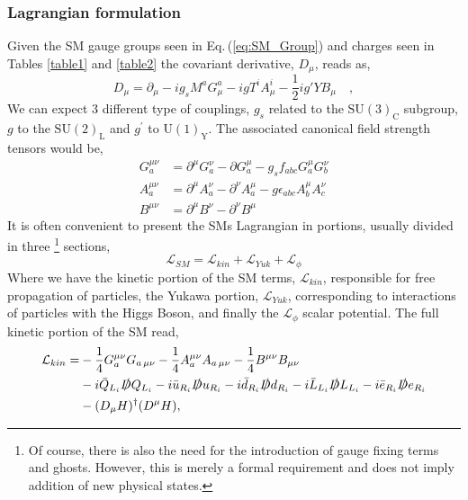 \subsubsection{Lagrangian formulation }
%
Given the SM gauge groups seen in  Eq.\,(\ref{eq:SM_Group}) and charges seen in Tables \ref{table1} and \ref{table2} the covariant derivative, $D_\mu$, reads as, 
%
\begin{equation}
\label{eq:PartialDefSM}
D_\mu = \partial_\mu - i g_s M^a G^a_\mu - i g T^i A^i_\mu - \frac{1}{2} i g' Y B_\mu \quad ,  
\end{equation}  
%
We can expect 3 different type of couplings, $g_s$ related to the $\mathrm{SU(3)_C}$ subgroup, $g$ to the $\mathrm{SU(2)_L}$ and $g^\prime$ to $\mathrm{U(1)_Y}$. The associated canonical field strength tensors would be,
\begin{align}
G_a^{\mu \nu} & = \partial^\mu G^\nu_a - \partial G^\mu_a - g_s f_{abc} G_a^\mu G_b^\nu  \\ 
A_a^{\mu \nu} & = \partial^\mu A^\nu_a - \partial^\nu A^\mu_a  - g \epsilon_{abc} A^\mu_b A^\nu_c \\
B^{\mu \nu}   & = \partial^\mu B^\nu - \partial^\nu B^\mu 
\end{align}
It is often convenient to present the SMs Lagrangian in portions, usually divided in three \footnote{Of course, there is also the need for the introduction of gauge fixing terms and ghosts. However, this is merely a formal requirement and does not imply addition of new physical states.} sections,
\begin{equation}
\mathcal{L}_{SM} = \mathcal{L}_{kin}  +  \mathcal{L}_{Yuk} +  \mathcal{L}_{\phi} 	
\end{equation}
Where we have the kinetic portion of the SM terms, $\mathcal{L}_{kin}$, responsible for  free propagation of particles, the Yukawa portion, $\mathcal{L}_{Yuk}$,  corresponding to interactions of particles with the Higgs Boson, and finally the $\mathcal{L}_{\phi}$ scalar potential. The full kinetic portion of the SM read, 
%
\begin{align}
\label{eq:KinSM}
\mathcal{L}_{kin} = & - \frac{1}{4} G^{\mu \nu}_a G_{a \, \mu \nu}  - \frac{1}{4}  A^{\mu \nu}_a A_{a \,\mu \nu}  
- \frac{1}{4}  B^{\mu \nu} B_{\mu \nu} \nonumber \\ 
 & -i \bar{Q}_{L_i} \slashed{D} Q_{L_i} 
   -i \bar{u}_{R_i} \slashed{D} u_{R_i}  
   -i \bar{d}_{R_i} \slashed{D} d_{R_i}  
   -i \bar{L}_{L_i} \slashed{D} L_{L_i}    
   -i \bar{e}_{R_i} \slashed{D} e_{R_i}   \\
 & - (D_\mu H)^\dagger ( D^\mu H ) ,  \nonumber 
\end{align}

